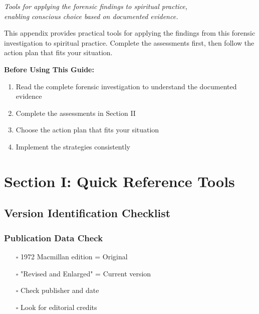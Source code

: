 \documentclass[11pt,twoside]{book}
\begin{document}
{\centering\itshape Tools for applying the forensic findings to spiritual practice,\\enabling conscious choice based on documented evidence.\par}
\vspace{0.3cm}

\normalfont\justifying
This appendix provides practical tools for applying the findings from this forensic investigation to spiritual practice. Complete the assessments first, then follow the action plan that fits your situation.

\textbf{Before Using This Guide:}
\begin{enumerate}
\item Read the complete forensic investigation to understand the documented evidence
\item Complete the assessments in Section II
\item Choose the action plan that fits your situation
\item Implement the strategies consistently
\end{enumerate}

\section*{Section I: Quick Reference Tools}
\label{sec:orgsection1}

\subsection*{Version Identification Checklist}
\label{sec:orgversioncheck}

\subsubsection*{Publication Data Check}
\label{sec:orgpubdata}
\begin{itemize}
\item[$\square$] 1972 Macmillan edition = Original
\item[$\square$] "Revised and Enlarged" = Current version
\item[$\square$] Check publisher and date
\item[$\square$] Look for editorial credits
\end{itemize}
\end{document}
